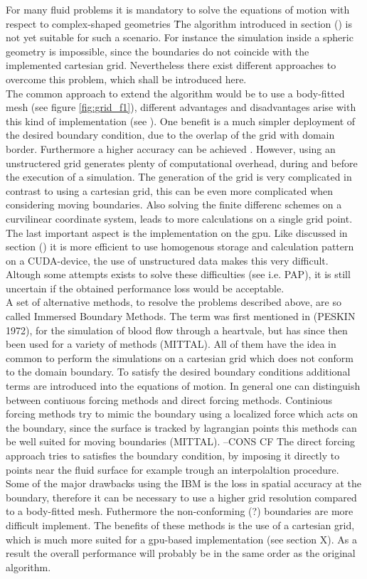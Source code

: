For many fluid problems it is mandatory to solve the equations of motion with respect to complex-shaped geometries \.
The algorithm introduced in section () is not yet suitable for such a scenario.
For instance the simulation inside a spheric geometry is impossible, since the boundaries
do not coincide with the implemented cartesian grid. Nevertheless there exist different approaches to overcome this problem,
which shall be introduced here. \\
The common approach to extend the algorithm would be to use a body-fitted mesh (see figure \ref{fig:grid_f1}),
different advantages and disadvantages arise with this kind of implementation (see \citep{Mittal2005}).
One benefit is a much simpler deployment of the desired boundary condition, due to the overlap of the grid with domain border.
Furthermore a higher accuracy can be achieved \citep{Gornak2013}.
However, using an unstructered grid generates plenty of computational overhead, during and before the execution of a simulation.
The generation of the grid is very complicated in contrast to using a cartesian grid, this can be even more complicated when
considering moving boundaries.
Also solving the finite differenc schemes on a curvilinear coordinate system, leads to more calculations on a single grid point.
The last important aspect is the implementation on the gpu.
Like discussed in section () it is more efficient to use homogenous storage and calculation pattern on a CUDA-device,
the use of unstructured data makes this very difficult.
Altough some attempts exists to solve these difficulties (see i.e. PAP), it is still uncertain if the obtained performance loss would be acceptable.\\
A set of alternative methods, to resolve the problems described above, are so called Immersed Boundary Methods.
The term was first mentioned in (PESKIN 1972), for the simulation of blood flow through a heartvale, but has since then been used for a variety of
methods (MITTAL).  All of them have the idea in common to perform the simulations on a cartesian grid which does not conform to the domain boundary.
To satisfy the desired boundary conditions additional terms are introduced into the equations of motion.
In general one can distinguish between contiuous forcing methods and direct forcing methods.
Continious forcing methods try to mimic the boundary using a localized force which acts on the boundary,
since the surface is tracked by lagrangian points this methods can be well suited for moving boundaries (MITTAL).
--CONS CF
The direct forcing approach tries to satisfies the boundary condition, by imposing it directly to points near the fluid surface for example
trough an interpolaltion procedure.
Some of the major drawbacks using the IBM is the loss in  spatial accuracy at the boundary, therefore it can be necessary to use a higher grid resolution
compared to a body-fitted mesh.  Futhermore the non-conforming (?) boundaries are more difficult implement.
The benefits of these methods is the use of a cartesian grid, which is much more suited for a gpu-based implementation (see section X).
As a result the overall performance will probably be in the same order as the original algorithm.



